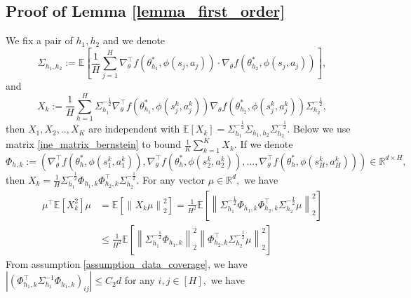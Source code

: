 \documentclass{article}
\numberwithin{equation}{section}
\theoremstyle{plain}
\theoremstyle{definition}
\theoremstyle{remark}
\begin{document}
\subsection{Proof of Lemma \ref{lemma_first_order}}\label{sec:lemma}

We fix a pair of $h_1,h_2$ and we denote
\begin{equation*}
    \Sigma_{h_1,h_2} := \mathbb{E}\left[\frac{1}{H}\sum_{j=1}^H \nabla_{\theta}^{\top}f\left(\theta_{h_1}^*, \phi\left(s_j, a_j\right)\right) \cdot \nabla_{\theta}f\left(\theta_{h_2}^*, \phi\left(s_j, a_j\right)\right)\right],
\end{equation*}
and
\begin{equation*}
    X_k := \frac{1}{H} \sum_{h=1}^H \Sigma_{h_1}^{-\frac{1}{2}} \nabla_{\theta}^{\top}f\left(\theta_{h_1}^*, \phi\left(s_j^k, a_j^k\right)\right) \nabla_{\theta}f\left(\theta_{h_2}^*, \phi\left(s_j^k, a_j^k\right)\right) \Sigma_{h_2}^{-\frac{1}{2}},
\end{equation*}
then $X_1,X_2,..,X_K$ are independent with $\mathbb{E}\left[X_k\right] = \Sigma_{h_1}^{-\frac{1}{2}} \Sigma_{h_1,h_2} \Sigma_{h_2}^{-\frac{1}{2}}.$ Below we use matrix \ref{ine_matrix_bernstein} to bound $\frac{1}{K}\sum_{k=1}^K X_k.$ If we denote
\begin{equation*}
    \Phi_{h,k} := \left(\nabla_{\theta}^{\top}f\left(\theta_{h}^*, \phi\left(s_1^k, a_1^k\right)\right),\nabla_{\theta}^{\top}f\left(\theta_{h}^*, \phi\left(s_2^k, a_2^k\right)\right),...,\nabla_{\theta}^{\top}f\left(\theta_{h}^*, \phi\left(s_H^k, a_H^k\right)\right)\right) \in \mathbb{R}^{d \times H},
\end{equation*}
then $X_k = \frac{1}{H} \Sigma_{h_1}^{-\frac{1}{2}} \Phi_{h_1,k} \Phi_{h_2,k}^{\top} \Sigma_{h_2}^{-\frac{1}{2}}.$ For any vector $\mu \in \mathbb{R}^d,$ we have
\begin{align*}
    \mu^{\top}\mathbb{E}\left[X_k^2\right] \mu 
    &= \mathbb{E}\left[\left\|X_k\mu\right\|_2^2\right] = \frac{1}{H^2} \mathbb{E}\left[\left\|\Sigma_{h_1}^{-\frac{1}{2}} \Phi_{h_1,k} \Phi_{h_2,k}^{\top} \Sigma_{h_2}^{-\frac{1}{2}} \mu\right\|_2^2\right]\\
    &\leq \frac{1}{H^2} \mathbb{E}\left[\left\|\Sigma_{h_1}^{-\frac{1}{2}} \Phi_{h_1,k} \right\|_2^2 \left\|\Phi_{h_2,k}^{\top} \Sigma_{h_2}^{-\frac{1}{2}} \mu \right\|_2^2\right]
\end{align*}
From assumption \ref{assumption_data_coverage}, we have $\left|\left(\Phi_{h_1,k}^{\top} \Sigma_{h_1}^{-1} \Phi_{h_1,k}\right)_{ij}\right| \leq C_2 d$ for any $i,j \in [H],$ we have
\end{document}
